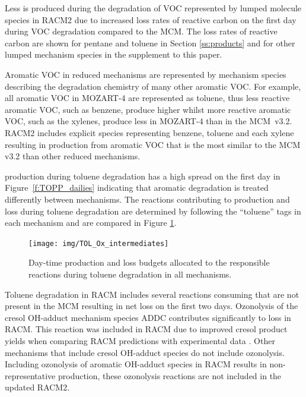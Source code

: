 Less  is produced during the degradation of VOC represented by lumped molecule species in RACM2 due to increased loss rates of reactive carbon on the first day during VOC degradation compared to the MCM.
The loss rates of reactive carbon are shown for pentane and toluene in Section \ref{ss:products} and for other lumped mechanism species in the supplement to this paper.

Aromatic VOC in reduced mechanisms are represented by mechanism species describing the degradation chemistry of many other aromatic VOC.
For example, all aromatic VOC in MOZART-4 are represented as toluene, thus less reactive aromatic VOC, such as benzene, produce higher  whilst more reactive aromatic VOC, such as the xylenes, produce less  in MOZART-4 than in the \mbox{MCM v3.2}.
RACM2 includes explicit species representing benzene, toluene and each xylene resulting in  production from aromatic VOC that is the most similar to the MCM v3.2 than other reduced mechanisms.

 production during toluene degradation has a high spread on the first day in \mbox{Figure \ref{f:TOPP_dailies}} indicating that aromatic degradation is treated differently between mechanisms.
The reactions contributing to  production and loss during toluene degradation are determined by following the ``toluene'' tags in each mechanism and are compared in Figure \ref{f:toluene_Ox}.
%
\begin{figure}
    \centering
    \texttt{[image: img/TOL\_Ox\_intermediates]}
    \vspace{0mm}
    \caption{Day-time  production and loss budgets allocated to the responsible reactions during toluene degradation in all mechanisms.}
    \vspace{-4mm}
    \label{f:toluene_Ox}
\end{figure}
%
Toluene degradation in RACM includes several reactions consuming  that are not present in the MCM resulting in net  loss on the first two days.
Ozonolysis of the cresol OH-adduct mechanism species ADDC contributes significantly to  loss in RACM.
This reaction was included in RACM due to improved cresol product yields when comparing RACM predictions with experimental data \citep{Stockwell:1997}. 
Other mechanisms that include cresol OH-adduct species do not include ozonolysis.
Including ozonolysis of aromatic OH-adduct species in RACM results in non-representative  production, these ozonolysis reactions are not included in the updated RACM2.

